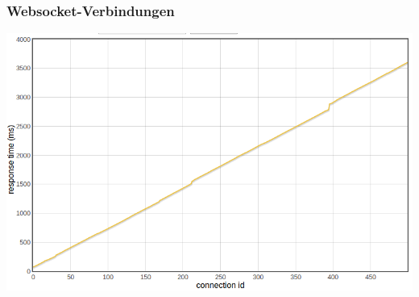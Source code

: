 \begin{frame}
\frametitle{Websocket-Verbindungen}
	\begin{center}
		\includegraphics[scale=0.3]{performance/connection-response.png}
	
	\end{center}
\end{frame}

